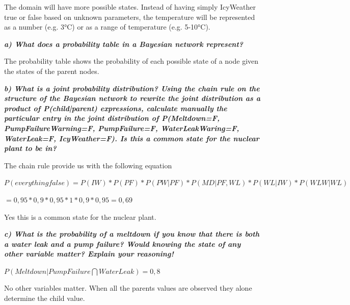 The domain will have more possible states. Instead of having simply IcyWeather true or
false based on unknown parameters, the temperature will be represented as a
number (e.g. 3°C) or as a range of temperature (e.g. 5-10°C).




\newpage
\thispagestyle{empty}

\textit{\textbf{a) What does a probability table in a Bayesian network represent?}}

The probability table shows the probability of each possible state of a node given
the states of the parent nodes.

\textit{\textbf{b) What is a joint probability distribution? Using the chain
rule on the structure of the Bayesian network to rewrite the joint distribution
as a product of P(child|parent) expressions, calculate manually the particular
entry in the joint distribution of P(Meltdown=F, PumpFailureWarning=F,
PumpFailure=F, WaterLeakWaring=F, WaterLeak=F, IcyWeather=F).
Is this a common state for the nuclear plant to be in?}}

The chain rule provide us with the following equation

$P(everything false) = P(IW) * P(PF) * P(PW | PF) * P(MD | PF, WL) * P(WL | IW) * P(WLW | WL)$

\hspace{7em}$= 0,95 * 0,9 * 0,95 * 1 * 0,9 * 0,95 = 0,69$

Yes this is a common state for the nuclear plant.

\textit{\textbf{c) What is the probability of a meltdown if you know that there
is both a water leak and a pump failure? Would knowing the state of any other
 variable matter? Explain your reasoning!}}

$P(Meltdown | PumpFailure \bigcap WaterLeak ) = 0,8$

No other variables matter.
When all the parents values are observed they alone determine the child value.


